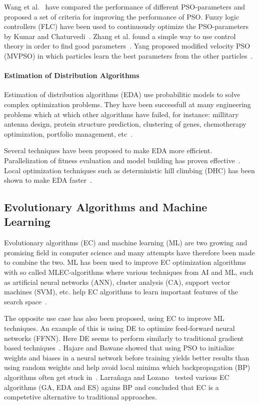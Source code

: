 Wang et al.~\cite{dang2012selection} have compared the performance of different PSO-parameters and proposed a set of criteria for improving the performance of PSO. Fuzzy logic controllers (FLC) have been used to continuously optimize the PSO-parameters by Kumar and Chaturvedi~\cite{kumar2011tuning}. Zhang et al. found a simple way to use control theory in order to find good parameters~\cite{zhang2011simple}. Yang proposed modified velocity PSO (MVPSO) in which particles learn the best parameters from the other particles~\cite{yang2011particle}.


\paragraph{Estimation of Distribution Algorithms}

Estimation of distribution algorithms (EDA) use probabilitic models to solve complex optimization problems. They have been successfull at many engineering problems which at which other algorithms have failed, for instance: millitary antenna design, protein structure prediction, clustering of genes, chemotherapy optimization, portfolio management, etc~\cite{Hauschild2011111}.

Several techniques have been proposed to make EDA more efficient. Parallelization of fitness evaluation and model building has proven effective~\cite{sastry2007towards}. Local optimization techniques such as deterministic hill climbing (DHC) has been shown to make EDA faster~\cite{hart1994adaptive}.

\subsection{Evolutionary Algorithms and Machine Learning}

Evolutionary algorithms (EC) and machine learning (ML) are two growing and promising field in computer science and many attempts have therefore been made to combine the two. ML has been used to improve EC optimization algorithms with so called MLEC-algorithms where various techniques from AI and ML, such as artificial neural networks (ANN), cluster analysis (CA), support vector machines (SVM), etc. help EC algorithms to learn important features of the search space~\cite{6052374}.

The opposite use case has also been proposed, using EC to improve ML techniques. An example of this is using DE to optimize feed-forward neural networks (FFNN). Here DE seems to perform similarly to traditional gradient based techniques~\cite{ilonen2003differential}. Hajare and Bawane showed that using PSO to initialize weights and biases in a neural network before training yields better results than using random weights and help avoid local minima which backpropagation (BP) algorithms often get stuck in~\cite{hajare2015feed}. Larra{\~n}aga and Lozano~\cite{larranaga2001estimation} tested various EC algorithms (GA, EDA and ES) agains BP and concluded that EC is a competetive alternative to traditional approaches.

